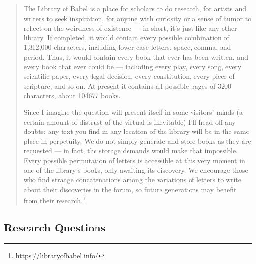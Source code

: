 \begin{quote}
  The Library of Babel is a place for scholars to do research, for artists and writers to seek inspiration, for anyone with curiosity or a sense of humor to reflect on the weirdness of existence --- in short, it’s just like any other library. If completed, it would contain every possible combination of 1,312,000 characters, including lower case letters, space, comma, and period. Thus, it would contain every book that ever has been written, and every book that ever could be --- including every play, every song, every scientific paper, every legal decision, every constitution, every piece of scripture, and so on. At present it contains all possible pages of 3200 characters, about 104677 books.

  Since I imagine the question will present itself in some visitors’ minds (a certain amount of distrust of the virtual is inevitable) I’ll head off any doubts: any text you find in any location of the library will be in the same place in perpetuity. We do not simply generate and store books as they are requested --- in fact, the storage demands would make that impossible. Every possible permutation of letters is accessible at this very moment in one of the library's books, only awaiting its discovery. We encourage those who find strange concatenations among the variations of letters to write about their discoveries in the forum, so future generations may benefit from their research.\footnote{\url{https://libraryofbabel.info/}}
\end{quote}

\subsection{Research Questions}

